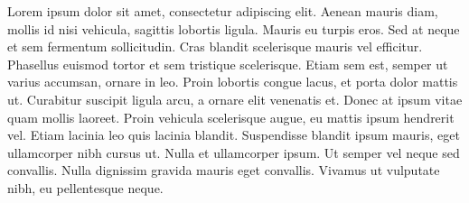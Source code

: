 
Lorem ipsum dolor sit amet, consectetur adipiscing elit. Aenean mauris diam, mollis id nisi vehicula, sagittis lobortis ligula. Mauris eu turpis eros. Sed at neque et sem fermentum sollicitudin. Cras blandit scelerisque mauris vel efficitur. Phasellus euismod tortor et sem tristique scelerisque. Etiam sem est, semper ut varius accumsan, ornare in leo. Proin lobortis congue lacus, et porta dolor mattis ut. Curabitur suscipit ligula arcu, a ornare elit venenatis et. Donec at ipsum vitae quam mollis laoreet. Proin vehicula scelerisque augue, eu mattis ipsum hendrerit vel. Etiam lacinia leo quis lacinia blandit. Suspendisse blandit ipsum mauris, eget ullamcorper nibh cursus ut. Nulla et ullamcorper ipsum. Ut semper vel neque sed convallis. Nulla dignissim gravida mauris eget convallis. Vivamus ut vulputate nibh, eu pellentesque neque. 


